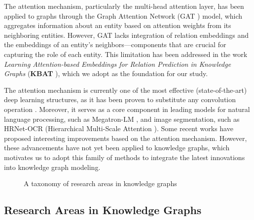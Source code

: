 The attention mechanism, particularly the multi-head attention layer, has been applied to graphs through the Graph Attention Network (GAT \cite{velivckovic2017graph}) model, which aggregates information about an entity based on attention weights from its neighboring entities. However, GAT lacks integration of relation embeddings and the embeddings of an entity's neighbors—components that are crucial for capturing the role of each entity. This limitation has been addressed in the work \textit{Learning Attention-based Embeddings for Relation Prediction in Knowledge Graphs} (\textbf{KBAT} \cite{nathani2019learning}), which we adopt as the foundation for our study.


The attention mechanism is currently one of the most effective (state-of-the-art) deep learning structures, as it has been proven to substitute any convolution operation \cite{cordonnier2019relationship}. Moreover, it serves as a core component in leading models for natural language processing, such as Megatron-LM \cite{shoeybi2019megatron}, and image segmentation, such as HRNet-OCR (Hierarchical Multi-Scale Attention \cite{tao2020hierarchical}). Some recent works \cite{cordonnier2020multi} have proposed interesting improvements based on the attention mechanism. However, these advancements have not yet been applied to knowledge graphs, which motivates us to adopt this family of methods to integrate the latest innovations into knowledge graph modeling.


\begin{figure*}[htbp]
	\centering
	\resizebox{1\textwidth}{!}{%
		
	}
	\caption{
		A taxonomy of research areas in knowledge graphs}
	\label{fig:categoriesResearch}
\end{figure*}


\subsection{Research Areas in Knowledge Graphs}


